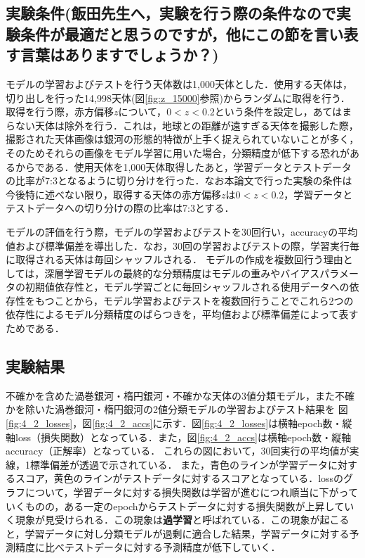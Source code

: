 \documentclass[a4j, 11pt]{jreport}
\begin{document}
\subsection{実験条件(飯田先生へ，実験を行う際の条件なので実験条件が最適だと思うのですが，他にこの節を言い表す言葉はありますでしょうか？)}
モデルの学習およびテストを行う天体数は1,000天体とした．使用する天体は，切り出しを行った14,998天体(図\ref{fig:z_15000}参照)からランダムに取得を行う．取得を行う際，赤方偏移$z$について，$0 < z < 0.2$という条件を設定し，あてはまらない天体は除外を行う．これは，地球との距離が遠すぎる天体を撮影した際，撮影された天体画像は銀河の形態的特徴が上手く捉えられていないことが多く，そのためそれらの画像をモデル学習に用いた場合，分類精度が低下する恐れがあるからである．使用天体を1,000天体取得したあと，学習データとテストデータの比率が7:3となるように切り分けを行った．なお本論文で行った実験の条件は今後特に述べない限り，取得する天体の赤方偏移$z$は$0 < z < 0.2$，学習データとテストデータへの切り分けの際の比率は7:3とする．

モデルの評価を行う際，モデルの学習およびテストを30回行い，accuracyの平均値および標準偏差を導出した．なお，30回の学習およびテストの際，学習実行毎に取得される天体は毎回シャッフルされる．
モデルの作成を複数回行う理由としては，深層学習モデルの最終的な分類精度はモデルの重みやバイアスパラメータの初期値依存性と，モデル学習ごとに毎回シャッフルされる使用データへの依存性をもつことから，モデル学習およびテストを複数回行うことでこれら2つの依存性によるモデル分類精度のばらつきを，平均値および標準偏差によって表すためである．


\subsection{実験結果}
不確かを含めた渦巻銀河・楕円銀河・不確かな天体の3値分類モデル，また不確かを除いた渦巻銀河・楕円銀河の2値分類モデルの学習およびテスト結果を
図\ref{fig:4_2_losses}，図\ref{fig:4_2_accs}に示す．図\ref{fig:4_2_losses}は横軸epoch数・縦軸loss（損失関数）となっている．また，図\ref{fig:4_2_accs}は横軸epoch数・縦軸accuracy（正解率）となっている．
これらの図において，30回実行の平均値が実線，1標準偏差が透過で示されている．
また，青色のラインが学習データに対するスコア，黄色のラインがテストデータに対するスコアとなっている．lossのグラフについて，学習データに対する損失関数は学習が進むにつれ順当に下がっていくものの，ある一定のepochからテストデータに対する損失関数が上昇していく現象が見受けられる．この現象は\textbf{過学習}と呼ばれている．この現象が起こると，学習データに対し分類モデルが過剰に適合した結果，学習データに対する予測精度に比べテストデータに対する予測精度が低下していく．
\end{document}
